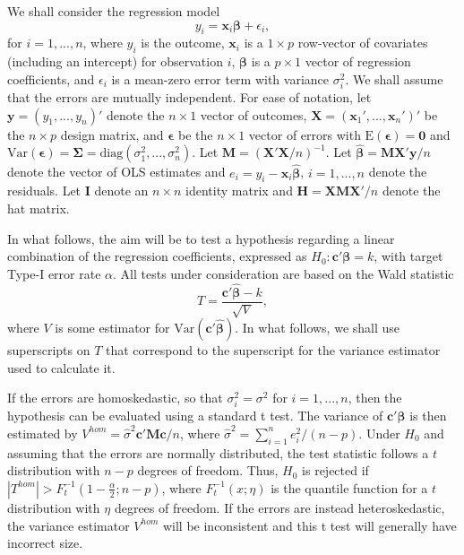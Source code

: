 \documentclass[12pt]{article}\usepackage[]{graphicx}\usepackage[]{color}
\newcommand{\E}{\text{E}}
\newcommand{\Var}{\text{Var}}
\newcommand{\diag}{\text{diag}}
\newcommand{\bm}{\mathbf}
\newcommand{\bs}{\boldsymbol}
\begin{document}
We shall consider the regression model
\begin{equation}
y_i = \bm{x}_i\bs\beta + \epsilon_i,
\end{equation}
for $i = 1,...,n$, where $y_i$ is the outcome, $\bm{x}_i$ is a $1 \times p$ row-vector of covariates (including an intercept) for observation $i$, $\bs\beta$ is a $p \times 1$ vector of regression coefficients, and $\epsilon_i$ is a mean-zero error term with variance $\sigma_i^2$. 
We shall assume that the errors are mutually independent. 
For ease of notation, let $\bm{y} = \left(y_1,...,y_n\right)'$ denote the $n \times 1$ vector of outcomes, $\bm{X} = \left(\bm{x}_1',...,\bm{x}_n'\right)'$ be the $n \times p$ design matrix, and $\bs\epsilon$ be the $n \times 1$ vector of errors with $\E\left(\bs\epsilon\right) = \bm{0}$ and $\Var\left(\bs\epsilon\right) = \bs\Sigma = \diag\left(\sigma_1^2,...,\sigma_n^2\right)$. 
Let $\bm{M} = \left(\bm{X}'\bm{X} / n\right)^{-1}$. 
Let $\bs{\hat\beta} = \bm{M}\bm{X}'\bm{y} / n$ denote the vector of OLS estimates and $e_i = y_i - \bm{x}_i \bs{\hat\beta}$, $i = 1,...,n$ denote the residuals. 
Let $\bm{I}$ denote an $n \times n$ identity matrix and $\bm{H} = \bm{X}\bm{M}\bm{X}' / n$ denote the hat matrix.

In what follows, the aim will be to test a hypothesis regarding a linear combination of the regression coefficients, expressed as $H_0: \bm{c}'\bs\beta = k$, with target Type-I error rate $\alpha$. 
All tests under consideration are based on the Wald statistic
\begin{equation}
T = \frac{\bm{c}'\bs{\hat\beta} - k}{\sqrt{V}},
\end{equation}
where $V$ is some estimator for $\Var\left(\bm{c}'\bs{\hat\beta}\right)$. In what follows, we shall use superscripts on $T$ that correspond to the superscript for the variance estimator used to calculate it.

If the errors are homoskedastic, so that $\sigma_i^2 = \sigma^2$ for $i = 1,...,n$, then the hypothesis can be evaluated using a standard t test. 
The variance of $\bm{c}'\bs\beta$ is then estimated by $V^{hom} = \hat\sigma^2 \bm{c}'\bm{M}\bm{c} / n$, where $\hat\sigma^2 = \sum_{i=1}^n e_i^2 / (n - p)$. 
Under $H_0$ and assuming that the errors are normally distributed, the test statistic follows a $t$ distribution with $n - p$ degrees of freedom. 
Thus, $H_0$ is rejected if $\left|T^{hom}\right| > F_t^{-1}\left(1 - \frac{\alpha}{2}; n - p\right)$, where $F_t^{-1}(x; \eta)$ is the quantile function for a $t$ distribution with $\eta$ degrees of freedom. 
If the errors are instead heteroskedastic, the variance estimator $V^{hom}$ will be inconsistent and this t test will generally have incorrect size. 
\end{document}
